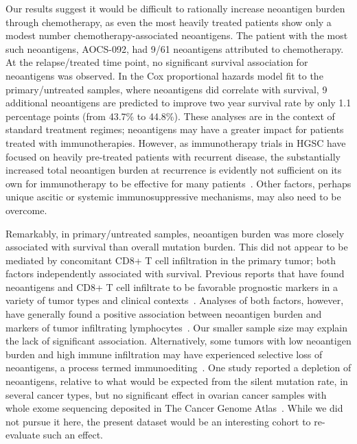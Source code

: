 \documentclass{bmcart}
\begin{document}
Our results suggest it would be difficult to rationally increase neoantigen burden through chemotherapy, as even the most heavily treated patients show only a modest number chemotherapy-associated neoantigens. The patient with the most such neoantigens, AOCS-092, had 9/61 neoantigens attributed to chemotherapy. At the relapse/treated time point, no significant survival association for neoantigens was observed. In the Cox proportional hazards model fit to the primary/untreated samples, where neoantigens did correlate with survival, 9 additional neoantigens are predicted to improve two year survival rate by only 1.1 percentage points (from 43.7\% to 44.8\%). These analyses are in the context of standard treatment regimes; neoantigens may have a greater impact for patients treated with immunotherapies. However, as immunotherapy trials in HGSC have focused on heavily pre-treated patients with recurrent disease, the substantially increased total neoantigen burden at recurrence is evidently not sufficient on its own for immunotherapy to be effective for many patients~\cite{Drerup2015,Hamanishi2015,Disis2016,Varga2017}. Other factors, perhaps unique ascitic or systemic immunosuppressive mechanisms, may also need to be overcome.



Remarkably, in primary/untreated samples, neoantigen burden was more closely associated with survival than overall mutation burden. This did not appear to be mediated by concomitant CD8+ T cell infiltration in the primary tumor; both factors independently associated with survival. Previous reports that have found neoantigens and CD8+ T cell infiltrate to be favorable prognostic markers in a variety of tumor types and clinical contexts~\cite{Sato2005,Hamanishi2007,Pages2010,Brown_2014,Mlecnik2016}. Analyses of both factors, however, have generally found a positive association between neoantigen burden and markers of tumor infiltrating lymphocytes~\cite{Rooney_2015,Giannakis2016}. Our smaller sample size may explain the lack of significant association. Alternatively, some tumors with low neoantigen burden and high immune infiltration may have experienced selective loss of neoantigens, a process termed immunoediting~\cite{Dunn2002}. One study reported a depletion of neoantigens, relative to what would be expected from the silent mutation rate, in several cancer types, but no significant effect in ovarian cancer samples with whole exome sequencing deposited in The Cancer Genome Atlas~\cite{Rooney_2015}. While we did not pursue it here, the present dataset would be an interesting cohort to re-evaluate such an effect.
\end{document}

